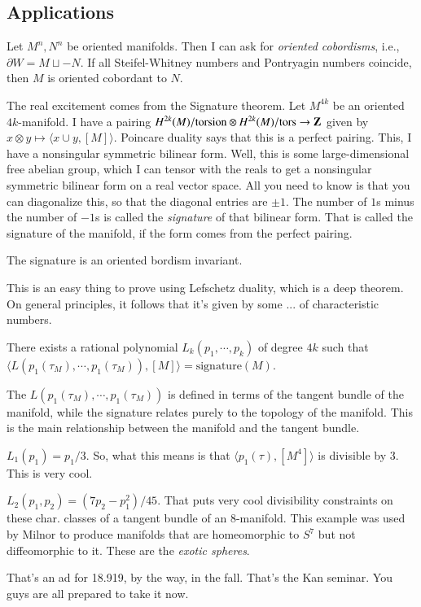 \subsection{Applications}
\begin{theorem}[Wall]
    Let $M^n,N^n$ be oriented manifolds.
    Then I can ask for \emph{oriented cobordisms}, i.e., $\partial W = M\sqcup -N$.
    If all Steifel-Whitney numbers and Pontryagin numbers coincide, then $M$ is oriented cobordant to $N$.
\end{theorem}
The real excitement comes from the Signature theorem.
Let $M^{4k}$ be an oriented $4k$-manifold.
I have a pairing $H^{2k}(M)/\mathrm{torsion}\otimes H^{2k}(M)/\mathrm{tors}\to \mathbf Z$ given by $x\otimes y\mapsto\langle x\cup y,[M]\rangle$.
Poincare duality says that this is a perfect pairing.
This, I have a nonsingular symmetric bilinear form.
Well, this is some large-dimensional free abelian group, which I can tensor with the reals to get a nonsingular symmetric bilinear form on a real vector space.
All you need to know is that you can diagonalize this, so that the diagonal entries are $\pm 1$.
The number of $1$s minus the number of $-1$s is called the \emph{signature} of that bilinear form.
That is called the signature of the manifold, if the form comes from the perfect pairing.
\begin{lemma}[Thom]
    The signature is an oriented bordism invariant.
\end{lemma}
This is an easy thing to prove using Lefschetz duality, which is a deep theorem.
On general principles, it follows that it's given by some ... of characteristic numbers.
\begin{theorem}
    There exists a rational polynomial $L_k(p_1,\cdots,p_k)$ of degree $4k$ such that $\langle L(p_1(\tau_M),\cdots,p_1(\tau_M)),[M]\rangle = \mathrm{signature}(M)$.
\end{theorem}
The $L(p_1(\tau_M),\cdots,p_1(\tau_M))$ is defined in terms of the tangent bundle of the manifold, while the signature relates purely to the topology of the manifold.
This is the main relationship between the manifold and the tangent bundle.
\begin{example}
    $L_1(p_1) = p_1/3$.
    So, what this means is that $\langle p_1(\tau),[M^4]\rangle$ is divisible by $3$.
    This is very cool.
\end{example}
\begin{example}
    $L_2(p_1,p_2) = (7p_2 - p_1^2)/45$.
    That puts very cool divisibility constraints on these char. classes of a tangent bundle of an $8$-manifold.
    This example was used by Milnor to produce manifolds that are homeomorphic to $S^7$ but not diffeomorphic to it.
    These are the \emph{exotic spheres}.
\end{example}
That's an ad for 18.919, by the way, in the fall.
That's the Kan seminar.
You guys are all prepared to take it now.
